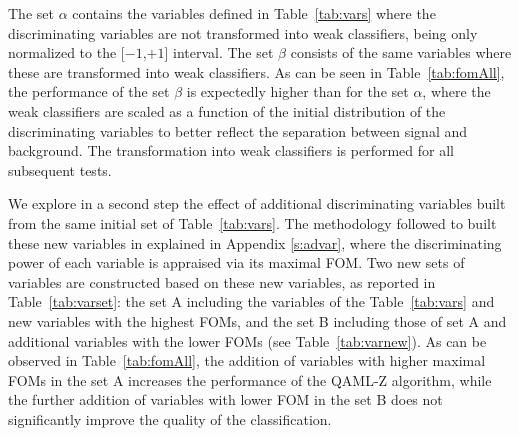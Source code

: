 \documentclass{article}
\begin{document}
The set $\alpha$ contains the variables defined in Table~\ref{tab:vars} 
where the discriminating variables are not transformed into weak 
classifiers, being only normalized to the [$-1$,$+1$] interval. The set 
$\beta$ consists of the same variables where these are transformed into 
weak classifiers. As can be seen in Table~\ref{tab:fomAll}, the 
performance of the set $\beta$ is expectedly higher than for the set 
$\alpha$, where the weak classifiers are scaled as a function of the 
initial distribution of the discriminating variables to better reflect the 
separation between signal and background. The transformation into weak 
classifiers is performed for all subsequent tests.

We explore in a second step the effect of additional discriminating 
variables built from the same initial set of Table~\ref{tab:vars}. The 
methodology followed to built these new variables in explained in Appendix 
\ref{s:advar}, where the discriminating power of each variable is 
appraised via its maximal FOM. Two new sets of variables are constructed 
based on these new variables, as reported in Table~\ref{tab:varset}: the 
set A including the variables of the Table~\ref{tab:vars} and new 
variables with the highest FOMs, and the set B including those of set A 
and additional variables with the lower FOMs (see Table~\ref{tab:varnew}). 
As can be observed in Table~\ref{tab:fomAll}, the addition of variables 
with higher maximal FOMs in the set A increases the performance of the 
QAML-Z algorithm, while the further addition of variables with lower FOM in
the set B does not significantly improve the quality of the classification.
\end{document}
